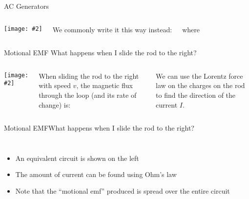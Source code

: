 \documentclass[12pt,aspectratio=169]{beamer}
\newcommand{\pic}[2]{\texttt{[image: \#2]}}
\newcommand{\eq}[2]{\vspace{#1}{\Large\begin{displaymath}#2\end{displaymath}}}
\begin{document}
\begin{frame}{AC Generators}
  \begin{columns}
    \pic{1}{generator.png}

    We commonly write it this way instead:
    
    \eq{-.25in}{\mathcal{E}=\mathcal{E}_{\textrm{max}}\sin(\omega t+\delta)}
    
    \vspace{-.2in}where

    \eq{-.25in}{
      \mathcal{E}_{\textrm{max}}=NBA\omega
    }
  \end{columns}
\end{frame}



\begin{frame}{Motional EMF}
  {What happens when I slide the rod to the right?}
  \begin{columns}
    \pic{1}{motional-emf-1.png}

    When sliding the rod to the right with speed $v$, the magnetic flux through
    the loop (and its rate of change) is:

    
    We can use the Lorentz force law on the charges on the rod to find the
    direction of the current $I$.
  \end{columns}
\end{frame}



\begin{frame}{Motional EMF}{What happens when I slide the rod to the right?}
  \begin{columns}
    \begin{itemize}
    \item An equivalent circuit is shown on the left
    \item The amount of current can be found using Ohm's law
    \item Note that the ``motional emf'' produced is spread over the entire
      circuit
    \end{itemize}
  \end{columns}
\end{frame}
\end{document}
